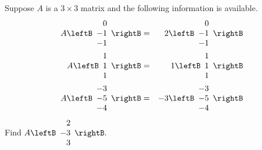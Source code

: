 \begin{enumialphparenastyle}
\begin{ex} Suppose $A$ is a $3\times 3$ matrix and the following information is
available.
\begin{eqnarray*}
A\leftB
\begin{array}{r}
0 \\
-1 \\
-1
\end{array}
\rightB &=&2\leftB
\begin{array}{r}
0 \\
-1 \\
-1
\end{array}
\rightB \\
A\leftB
\begin{array}{r}
1 \\
1 \\
1
\end{array}
\rightB &=& 1\leftB
\begin{array}{r}
1 \\
1 \\
1
\end{array}
\rightB \\
A\leftB
\begin{array}{r}
-3 \\
-5 \\
-4
\end{array}
\rightB &=&-3\leftB
\begin{array}{r}
-3 \\
-5 \\
-4
\end{array}
\rightB
\end{eqnarray*}
Find $A\leftB
\begin{array}{r}
2 \\
-3 \\
3
\end{array}
\rightB. $ \vspace{1mm}
\end{ex}

\end{enumialphparenastyle}